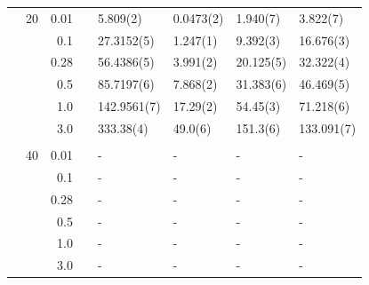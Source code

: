 \begin{table}
\begin{tabularx}{\textwidth}{R{1.5cm}rrcR{2.3cm}R{2.3cm}R{2.3cm}R{2.3cm}}
		&20 & 0.01 && 5.809(2) & 0.0473(2) & 1.940(7) & 3.822(7) \\
		&& 0.1 && 27.3152(5) & 1.247(1) & 9.392(3) & 16.676(3) \\
		&& 0.28 && 56.4386(5) & 3.991(2) & 20.125(5) & 32.322(4) \\
		&& 0.5 && 85.7197(6) & 7.868(2) & 31.383(6) & 46.469(5) \\
		&& 1.0 && 142.9561(7) & 17.29(2) & 54.45(3) & 71.218(6) \\
		&& 3.0 && 333.38(4) & 49.0(6) & 151.3(6) & 133.091(7) \\ \hdashline \\
		
		&40 & 0.01 && - & - & - & - \\
		&& 0.1 && - & - & - & - \\
		&& 0.28 && - & - & - & - \\
		&& 0.5 && - & - & - & - \\
		&& 1.0 && - & - & - & - \\
		&& 3.0 && - & - & - & - \\ \hline \hline
	\end{tabularx}
\end{table}

